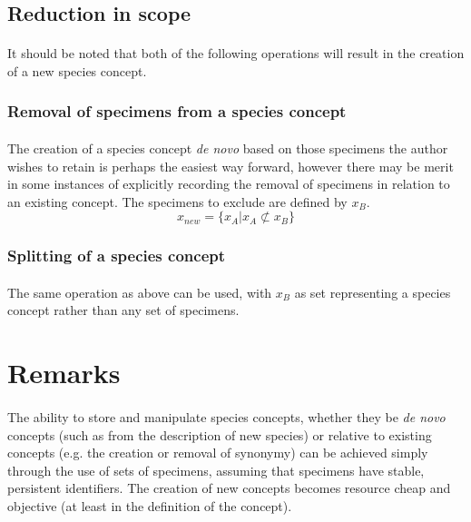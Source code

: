 \documentclass{article}
\begin{document}
   \subsection{Reduction in scope}
   \paragraph{}
   It should be noted that both of the following operations will result in the creation of a new species concept.
   \subsubsection{Removal of specimens from a species concept}
   \paragraph{}
   The creation of a species concept \textit{de novo} based on those specimens the author wishes to retain is perhaps the easiest way forward, however there may be merit in some instances of explicitly recording the removal of specimens in relation to an existing concept. The specimens to exclude are defined by $x_B$.
   \[x_{new} = \{x_A|x_A \not\subset x_B\}\] 
   \subsubsection{Splitting of a species concept}
   \paragraph{}
   The same operation as above can be used, with $x_B$ as set representing a species concept rather than any set of specimens.
   
   \section{Remarks}
   \paragraph{}
   The ability to store and manipulate species concepts, whether they be \textit{de novo} concepts (such as from the description of new species) or relative to existing concepts (e.g. the creation or removal of synonymy) can be achieved simply through the use of sets of specimens, assuming that specimens have stable, persistent identifiers. The creation of new concepts becomes resource cheap and objective (at least in the definition of the concept).
   
\end{document}
